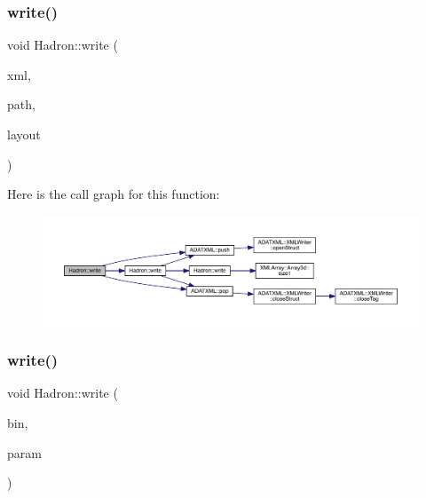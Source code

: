 \subsubsection{\texorpdfstring{write()}{write()}\hspace{0.1cm}{\footnotesize\ttfamily [7/95]}}
{\footnotesize\ttfamily void Hadron\+::write (\begin{DoxyParamCaption}\item[{\mbox{\hyperlink{classADATXML_1_1XMLWriter}{X\+M\+L\+Writer}} \&}]{xml,  }\item[{const std\+::string \&}]{path,  }\item[{const \mbox{\hyperlink{structHadron_1_1Layout_1_1Layout__t}{Layout\+::\+Layout\+\_\+t}} \&}]{layout }\end{DoxyParamCaption})}

Here is the call graph for this function\+:
\nopagebreak
\begin{figure}[H]
\begin{center}
\leavevmode
\includegraphics[width=350pt]{d1/daf/namespaceHadron_ae327bbb04efa053f7be135b73bb596a7_cgraph}
\end{center}
\end{figure}
\mbox{\label{namespaceHadron_a0051134178fb8346e89720a478b8a8f1}} 
\subsubsection{\texorpdfstring{write()}{write()}\hspace{0.1cm}{\footnotesize\ttfamily [8/95]}}
{\footnotesize\ttfamily void Hadron\+::write (\begin{DoxyParamCaption}\item[{\mbox{\hyperlink{classADATIO_1_1BinaryWriter}{Binary\+Writer}} \&}]{bin,  }\item[{const \mbox{\hyperlink{structHadron_1_1HadronNptType__t}{Hadron\+Npt\+Type\+\_\+t}} \&}]{param }\end{DoxyParamCaption})}


